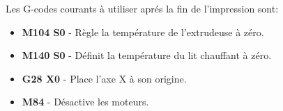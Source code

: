 Les G-codes courants à utiliser aprés la fin de l'impression sont:
\begin{itemize}
	\item \textbf{M104 S0}  - Règle la température de l'extrudeuse à zéro.
	\item \textbf{M140 S0} - Définit la température du lit chauffant à zéro.
	\item \textbf{G28 X0} - Place l'axe X à son origine.
	\item \textbf{M84}  - Désactive les moteurs.
\end{itemize}

